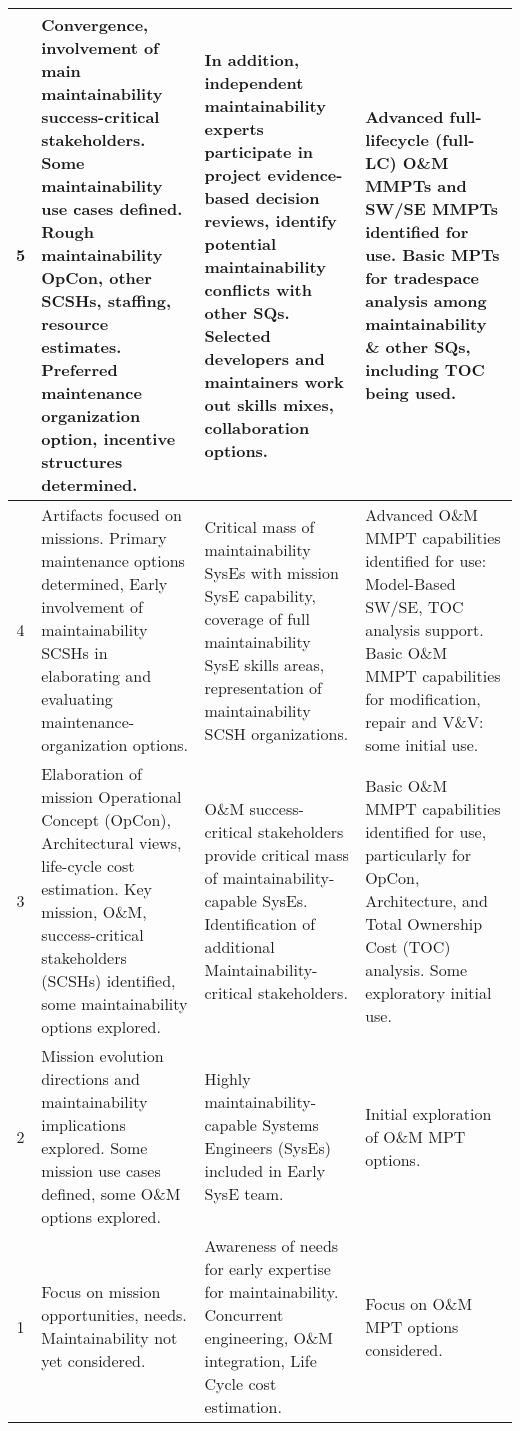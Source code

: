 \begin{table*}[htbp]
{\begin{tabular}{|c|p{18em}|p{18em}|p{16.5em}|}
			\midrule
			5     & Convergence, involvement of main maintainability success-critical stakeholders. Some maintainability use cases defined. Rough maintainability OpCon, other SCSHs, staffing, resource estimates. Preferred maintenance organization option, incentive structures determined. & In addition, independent maintainability experts participate in project evidence-based decision reviews, identify potential maintainability conflicts with other SQs. Selected developers and maintainers work out skills mixes, collaboration options. & Advanced full-lifecycle (full-LC) O\&M MMPTs and SW/SE MMPTs identified for use. Basic MPTs for tradespace analysis among maintainability \& other SQs, including TOC being used. \\
			\midrule
			4     & Artifacts focused on missions. Primary maintenance options determined, Early involvement of maintainability SCSHs in elaborating and evaluating maintenance-organization options. & Critical mass of maintainability SysEs with mission SysE capability, coverage of full maintainability SysE skills areas, representation of maintainability SCSH organizations. & Advanced O\&M MMPT capabilities identified for use: Model-Based SW/SE, TOC analysis support. Basic O\&M MMPT capabilities for modification, repair and V\&V: some initial use. \\
			\midrule
			3     & Elaboration of mission Operational Concept (OpCon), Architectural views, life-cycle cost estimation. Key mission, O\&M, success-critical stakeholders (SCSHs) identified, some maintainability options explored. & O\&M success-critical stakeholders provide critical mass of maintainability-capable SysEs. Identification of additional Maintainability-critical stakeholders. & Basic O\&M MMPT capabilities identified for use, particularly for OpCon, Architecture, and Total Ownership Cost (TOC) analysis. Some exploratory initial use. \\
			\midrule
			2     & Mission evolution directions and maintainability implications explored. Some mission use cases defined, some O\&M options explored. & Highly maintainability-capable Systems Engineers (SysEs) included in Early SysE team. & Initial exploration of O\&M MPT options. \\
			\midrule
			1     & Focus on mission opportunities, needs. Maintainability not yet considered. & Awareness of needs for early expertise for maintainability. Concurrent engineering, O\&M integration, Life Cycle cost estimation. & Focus on O\&M MPT options considered. \\
			\bottomrule
		\end{tabular}%
	}
	\label{tab:smrf}%
\end{table*}%

